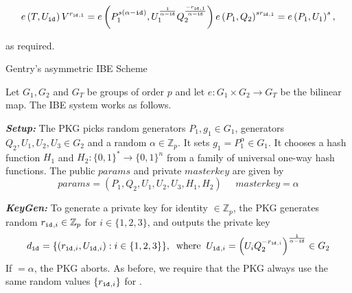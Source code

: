 \begin{equation*}
 e \left( T, U_{\mathtt{id}_{}} \right) V^{r_{ \mathtt{id}_{},1}} = e \left( P_1^{s\left( \alpha - \mathtt{id}_{} \right)}, U_1^{\frac{1}{\alpha - \mathtt{id}_{}}} Q_2^{\frac{- r_{\mathtt{id}_{},1}}{\alpha - \mathtt{id}_{}}} \right) e \left( P_1, Q_2 \right)^{s r_{\mathtt{id}_{},1}} = e \left( P_1, U_1\right)^s,
\end{equation*}

as required.

\begin{algorithm}
\caption{Gentry's asymmetric IBE Scheme~\cite{art:Gentry06}}
\label{alg:gentrys_scheme}
Let $G_1 , G_2$ and $G_T$ be groups of order $p$ and let $e : G_1 \times G_2 \rightarrow G_T$ be the bilinear map. The IBE system works as follows.

\begin{description}
\item \textbf{\textit{Setup:}} The PKG picks random generators $P_1, g_1 \in G_1$, generators $Q_2, U_1, U_2, U_3 \in G_2$ and a random $\alpha \in \mathbb{Z}_p$. It sets $g_1 = P_1^{\alpha} \in G_1$. It chooses a hash function $H_1$ and $H_2: \{ 0,1 \}^* \rightarrow \{ 0 , 1 \}^n$ from a family of universal one-way hash functions. The public $params$ and private $masterkey$ are given by
\begin{equation*}
 params = \left( P_1,Q_2,U_1,U_2,U_3,H_1,H_2\right) \; \; \; \; \; masterkey = \alpha
\end{equation*}

\item \textbf{\textit{KeyGen:}} To generate a private key for identity \id{} $\in \mathbb{Z}_p$, the PKG generates random $r_{\mathtt{id}_{},i} \in \mathbb{Z}_p$ for $i \in \{1,2,3\}$, and outputs the private key
\begin{equation*}
 d_{\mathtt{id}_{}} = \{ \left( r_{\mathtt{id}_{},i}, U_{\mathtt{id}_{},i} \right) : i \in \{ 1, 2, 3\}\}, \; \; \textrm{where} \; \; U_{\mathtt{id}_{},i} = \left( U_{i}Q_2^{-r_{\mathtt{id}_{},i}} \right)^{\frac{1}{\alpha-\mathtt{id}_{}}} \in G_2
\end{equation*}
If \id{} $ = \alpha $, the PKG aborts. As before, we require that the PKG always use the same random values $\{r_{\mathtt{id}_{},i}\}$ for \id{}.


\end{description}
\end{algorithm}
